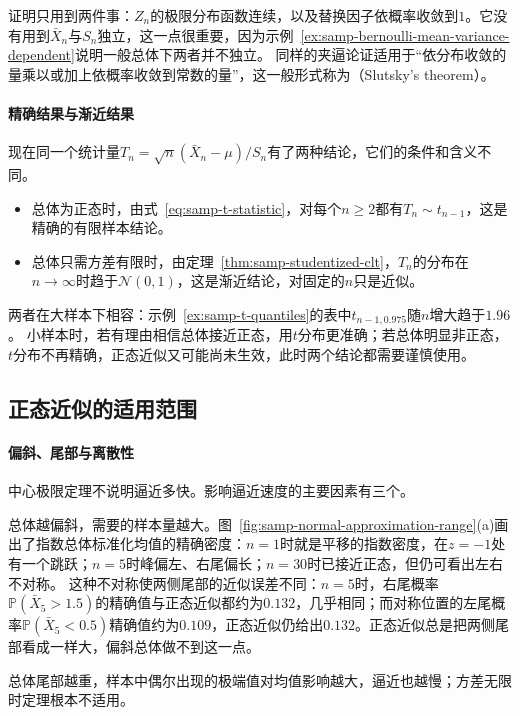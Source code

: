 证明只用到两件事：$Z_n$的极限分布函数连续，以及替换因子依概率收敛到$1$。它没有用到$\bar X_n$与$S_n$独立，这一点很重要，因为示例~\ref{ex:samp-bernoulli-mean-variance-dependent}说明一般总体下两者并不独立。
同样的夹逼论证适用于“依分布收敛的量乘以或加上依概率收敛到常数的量”，这一般形式称为（Slutsky's theorem）。

\paragraph{精确结果与渐近结果}
现在同一个统计量$T_n=\sqrt n(\bar X_n-\mu)/S_n$有了两种结论，它们的条件和含义不同。
\begin{itemize}
  \item 总体为正态时，由式~\eqref{eq:samp-t-statistic}，对每个$n\geq2$都有$T_n\sim t_{n-1}$，这是精确的有限样本结论。
  \item 总体只需方差有限时，由定理~\ref{thm:samp-studentized-clt}，$T_n$的分布在$n\to\infty$时趋于$\mathcal N(0,1)$，这是渐近结论，对固定的$n$只是近似。
\end{itemize}
两者在大样本下相容：示例~\ref{ex:samp-t-quantiles}的表中$t_{n-1,0.975}$随$n$增大趋于$1.96$。
小样本时，若有理由相信总体接近正态，用$t$分布更准确；若总体明显非正态，$t$分布不再精确，正态近似又可能尚未生效，此时两个结论都需要谨慎使用。

\subsection{正态近似的适用范围}
\label{sec:samp-normal-approximation-range}

\paragraph{偏斜、尾部与离散性}
中心极限定理不说明逼近多快。影响逼近速度的主要因素有三个。

总体越偏斜，需要的样本量越大。图~\ref{fig:samp-normal-approximation-range}(a)画出了指数总体标准化均值的精确密度：$n=1$时就是平移的指数密度，在$z=-1$处有一个跳跃；$n=5$时峰偏左、右尾偏长；$n=30$时已接近正态，但仍可看出左右不对称。
这种不对称使两侧尾部的近似误差不同：$n=5$时，右尾概率$\mathbb{P}(\bar X_5>1.5)$的精确值与正态近似都约为$0.132$，几乎相同；而对称位置的左尾概率$\mathbb{P}(\bar X_5<0.5)$精确值约为$0.109$，正态近似仍给出$0.132$。正态近似总是把两侧尾部看成一样大，偏斜总体做不到这一点。

总体尾部越重，样本中偶尔出现的极端值对均值影响越大，逼近也越慢；方差无限时定理根本不适用。


